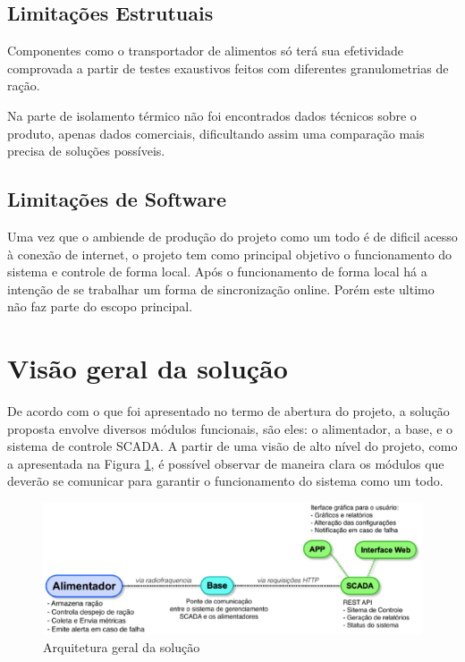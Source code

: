 \subsection{Limitações Estrutuais}
Componentes como o transportador de alimentos só terá sua efetividade comprovada a partir de testes exaustivos feitos com diferentes granulometrias de ração.

Na parte de isolamento térmico não foi encontrados dados técnicos sobre o produto, apenas dados comerciais, dificultando assim uma comparação mais precisa de soluções possíveis.

\subsection{Limitações de Software}

Uma vez que o ambiende de produção do projeto como um todo é de dificil acesso à conexão de internet, o projeto tem como principal objetivo o funcionamento do sistema e controle de forma local. Após o funcionamento de forma local há a intenção de se trabalhar um forma de sincronização online. Porém este ultimo não faz parte do escopo principal.

\section{Visão geral da solução}

De acordo com o que foi apresentado no termo de abertura do projeto, a solução proposta envolve diversos módulos funcionais, são eles: o alimentador, a base, e o sistema de controle SCADA. A partir de uma visão de alto nível do projeto, como a apresentada na Figura \ref{diagrama}, é possível observar de maneira clara os módulos que deverão se comunicar para garantir o funcionamento do sistema como um todo.

\begin{figure}[H]
 \centering
   \includegraphics[keepaspectratio=true,scale=0.8]{figuras/digrama_geral.eps}
 \caption{Arquitetura geral da solução}
 \label{diagrama}
\end{figure}

